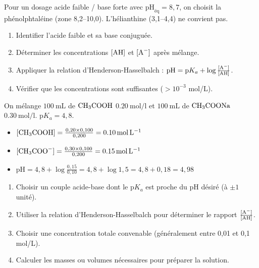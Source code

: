 \begin{exemple}
Pour un dosage acide faible / base forte avec $\mathrm{pH}_{\text{éq}} = 8,7$, on choisit la phénolphtaléine (zone 8,2--10,0). L'hélianthine (3,1--4,4) ne convient pas.
\end{exemple}

\begin{enumerate}
    \item Identifier l'acide faible et sa base conjuguée.
    \item Déterminer les concentrations $[\ce{AH}]$ et $[\ce{A-}]$ après mélange.
    \item Appliquer la relation d'Henderson-Hasselbalch : $\mathrm{pH} = \mathrm{p}K_a + \log\frac{[\ce{A-}]}{[\ce{AH}]}$.
    \item Vérifier que les concentrations sont suffisantes ($> 10^{-3}$ mol/L).
\end{enumerate}

\begin{exemple}
On mélange $\SI{100}{\mL}$ de $\ce{CH3COOH}$ $\SI{0,20}{\mol\per\litre}$ et $\SI{100}{\mL}$ de $\ce{CH3COONa}$ $\SI{0,30}{\mol\per\litre}$. $\mathrm{p}K_a = 4,8$.
\begin{itemize}
    \item $[\ce{CH3COOH}] = \frac{0,20 \times 0,100}{0,200} = \SI{0,10}{\mol\per\litre}$
    \item $[\ce{CH3COO-}] = \frac{0,30 \times 0,100}{0,200} = \SI{0,15}{\mol\per\litre}$
    \item $\mathrm{pH} = 4,8 + \log\frac{0,15}{0,10} = 4,8 + \log 1,5 = 4,8 + 0,18 = 4,98$
\end{itemize}
\end{exemple}

\begin{enumerate}
    \item Choisir un couple acide-base dont le $\mathrm{p}K_a$ est proche du pH désiré (à $\pm 1$ unité).
    \item Utiliser la relation d'Henderson-Hasselbalch pour déterminer le rapport $\frac{[\ce{A-}]}{[\ce{AH}]}$.
    \item Choisir une concentration totale convenable (généralement entre 0,01 et 0,1 mol/L).
    \item Calculer les masses ou volumes nécessaires pour préparer la solution.
\end{enumerate}

